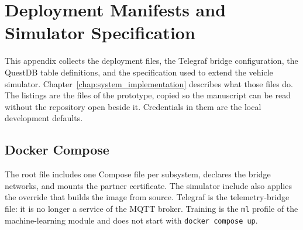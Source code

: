 \chapter{Deployment Manifests and Simulator Specification}
\label{app:deployment}

This appendix collects the deployment files, the Telegraf bridge configuration, the QuestDB table definitions, and the specification used to extend the vehicle simulator. Chapter~\ref{chap:system_implementation} describes what those files do. The listings are the files of the prototype, copied so the manuscript can be read without the repository open beside it. Credentials in them are the local development defaults.

\section{Docker Compose}
\label{sec:app_compose}

The root file includes one Compose file per subsystem, declares the bridge networks, and mounts the partner certificate. The simulator include also applies the override that builds the image from source. Telegraf is the telemetry-bridge file: it is no longer a service of the MQTT broker. Training is the \texttt{ml} profile of the machine-learning module and does not start with \texttt{docker compose up}.













